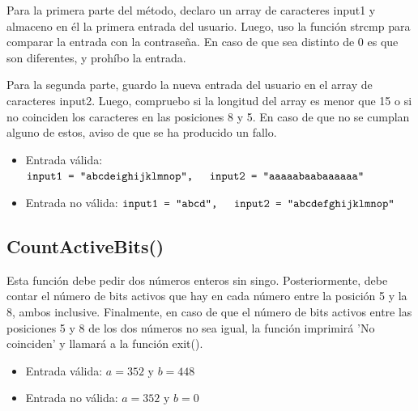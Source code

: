 \documentclass[11pt,a4paper]{article}
\begin{document}
Para la primera parte del método, declaro un array de caracteres input1 y almaceno en él la primera entrada del usuario. Luego, uso la función strcmp para comparar la entrada con la contraseña. En caso de que sea distinto de 0 es que son diferentes, y prohíbo la entrada.

Para la segunda parte, guardo la nueva entrada del usuario en el array de caracteres input2. Luego, compruebo si la longitud del array es menor que 15 o si no coinciden los caracteres en las posiciones 8 y 5. En caso de que no se cumplan alguno de estos, aviso de que se ha producido un fallo.

\begin{itemize}
  \item Entrada válida: \(\texttt{input1 = \text{''abcdeighijklmnop''}, \hspace{1.5mm} input2 = \text{''aaaaabaabaaaaaa''}}\)
  \item Entrada no válida: \(\texttt{input1 = \text{''abcd''}, \hspace{1.5mm} input2 = \text{''abcdefghijklmnop''}}\)
\end{itemize}
\subsection{CountActiveBits()}
Esta función debe pedir dos números enteros sin singo. Posteriormente, debe contar el número de bits activos
que hay en cada número entre la posición 5 y la 8, ambos inclusive. Finalmente, en caso de que el 
número de bits activos entre las posiciones 5 y 8 de los dos números   no sea igual, la función 
imprimirá 'No coinciden' y llamará a la función exit().
\begin{itemize}
  \item Entrada válida: \(a = 352 \text{ y } b = 448\)
  \item Entrada no válida: \(a = 352 \text{ y } b = 0\)
\end{itemize}
\end{document}
